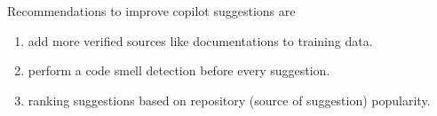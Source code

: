 Recommendations to improve copilot suggestions are
\begin{enumerate}
    \item add more verified sources like documentations to training data.
    \item perform a code smell detection before every suggestion.
    \item ranking suggestions based on repository (source of suggestion) popularity.
\end{enumerate}
